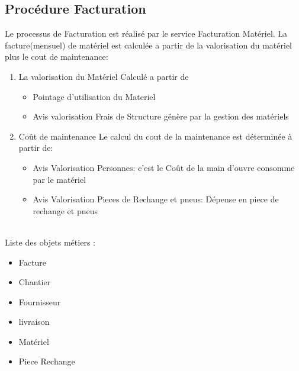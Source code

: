 \documentclass [a4paper] {report}
\begin{document}
\subsection{Procédure Facturation}
	Le processus de Facturation est réalisé par le service Facturation Matériel. La facture(mensuel) de matériel est calculée a partir de 
	la valorisation du matériel plus le cout de maintenance:\\
\begin {enumerate}
	\item La valorisation du Matériel
		Calculé a partir de \\
		\begin{itemize}
			\item Pointage d'utilisation du Materiel\\
			\item Avis valorisation Frais de Structure génère par la gestion des matériels	\\
		\end{itemize}	
	\item Coût de maintenance
		Le calcul du cout de la maintenance est déterminée à partir de:\\
		\begin{itemize}
			\item Avis Valorisation Personnes: c'est le Coût de la main d'ouvre  consomme par le matériel\\
			\item Avis Valorisation Pieces de Rechange et pneus: Dépense en piece de rechange et pneus \\
		\end{itemize}

\end{enumerate}
\hfill\\

Liste des objets métiers :
\begin{itemize}
	\item	Facture\\
	\item Chantier\\
	\item Fournisseur\\
	\item livraison
	\item Matériel\\
	\item Piece Rechange\\
\end{itemize}
\end{document}
